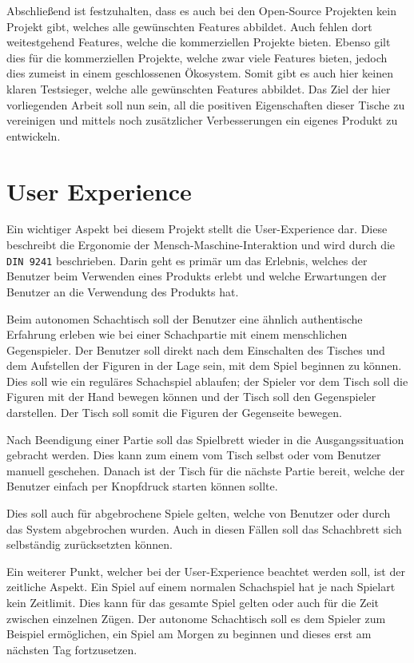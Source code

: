 Abschließend ist festzuhalten, dass es auch bei den Open-Source
Projekten kein Projekt gibt, welches alle gewünschten Features abbildet.
Auch fehlen dort weitestgehend Features, welche die kommerziellen
Projekte bieten. Ebenso gilt dies für die kommerziellen Projekte, welche
zwar viele Features bieten, jedoch dies zumeist in einem geschlossenen
Ökosystem. Somit gibt es auch hier keinen klaren Testsieger, welche alle
gewünschten Features abbildet. Das Ziel der hier vorliegenden Arbeit
soll nun sein, all die positiven Eigenschaften dieser Tische zu
vereinigen und mittels noch zusätzlicher Verbesserungen ein eigenes
Produkt zu entwickeln.

\hypertarget{user-experience}{%
\section{User Experience}\label{user-experience}}

Ein wichtiger Aspekt bei diesem Projekt stellt die User-Experience dar.
Diese beschreibt die Ergonomie der Mensch-Maschine-Interaktion und wird
durch die \passthrough{\lstinline!DIN 9241!}\cite{din9241}
beschrieben. Darin geht es primär um das Erlebnis, welches der Benutzer
beim Verwenden eines Produkts erlebt und welche Erwartungen der Benutzer
an die Verwendung des Produkts hat.

Beim autonomen Schachtisch soll der Benutzer eine ähnlich authentische
Erfahrung erleben wie bei einer Schachpartie mit einem menschlichen
Gegenspieler. Der Benutzer soll direkt nach dem Einschalten des Tisches
und dem Aufstellen der Figuren in der Lage sein, mit dem Spiel beginnen
zu können. Dies soll wie ein reguläres Schachspiel ablaufen; der Spieler
vor dem Tisch soll die Figuren mit der Hand bewegen können und der Tisch
soll den Gegenspieler darstellen. Der Tisch soll somit die Figuren der
Gegenseite bewegen.

Nach Beendigung einer Partie soll das Spielbrett wieder in die
Ausgangssituation gebracht werden. Dies kann zum einem vom Tisch selbst
oder vom Benutzer manuell geschehen. Danach ist der Tisch für die
nächste Partie bereit, welche der Benutzer einfach per Knopfdruck
starten können sollte.

Dies soll auch für abgebrochene Spiele gelten, welche von Benutzer oder
durch das System abgebrochen wurden. Auch in diesen Fällen soll das
Schachbrett sich selbständig zurücksetzten können.

Ein weiterer Punkt, welcher bei der User-Experience beachtet werden
soll, ist der zeitliche Aspekt. Ein Spiel auf einem normalen Schachspiel
hat je nach Spielart kein Zeitlimit. Dies kann für das gesamte Spiel
gelten oder auch für die Zeit zwischen einzelnen Zügen. Der autonome
Schachtisch soll es dem Spieler zum Beispiel ermöglichen, ein Spiel am
Morgen zu beginnen und dieses erst am nächsten Tag fortzusetzen.

